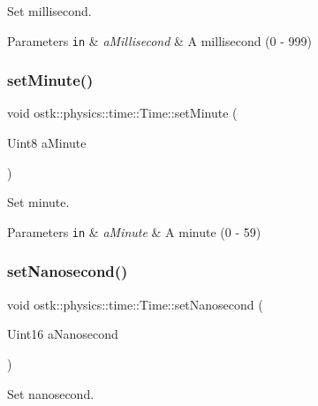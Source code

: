 Set millisecond. 


\begin{DoxyParams}[1]{Parameters}
\mbox{\tt in}  & {\em a\+Millisecond} & A millisecond (0 -\/ 999) \\
\hline
\end{DoxyParams}
\mbox{\label{classostk_1_1physics_1_1time_1_1_time_aef028b25ce2ff2d216e9fdc957c6ac4f}} 
\subsubsection{\texorpdfstring{set\+Minute()}{setMinute()}}
{\footnotesize\ttfamily void ostk\+::physics\+::time\+::\+Time\+::set\+Minute (\begin{DoxyParamCaption}\item[{Uint8}]{a\+Minute }\end{DoxyParamCaption})}



Set minute. 


\begin{DoxyParams}[1]{Parameters}
\mbox{\tt in}  & {\em a\+Minute} & A minute (0 -\/ 59) \\
\hline
\end{DoxyParams}
\mbox{\label{classostk_1_1physics_1_1time_1_1_time_a35df10195d96fe03990493a52cd7d61e}} 
\subsubsection{\texorpdfstring{set\+Nanosecond()}{setNanosecond()}}
{\footnotesize\ttfamily void ostk\+::physics\+::time\+::\+Time\+::set\+Nanosecond (\begin{DoxyParamCaption}\item[{Uint16}]{a\+Nanosecond }\end{DoxyParamCaption})}



Set nanosecond. 


